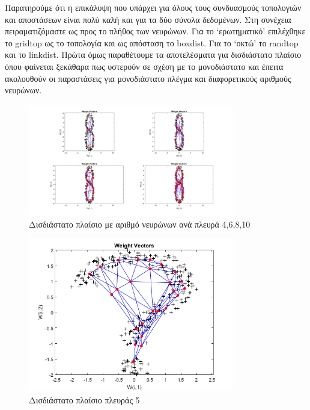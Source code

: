 \documentclass[12pt]{article}
\begin{document}
Παρατηρούμε ότι η επικάλυψη που υπάρχει για όλους τους συνδυασμούς τοπολογιών και αποστάσεων είναι πολύ καλή και για τα δύο σύνολα δεδομένων. Στη συνέχεια πειραματιζόμαστε ως προς το πλήθος των νευρώνων. Για το `ερωτηματικό' επιλέχθηκε το gridtop ως το τοπολογία και ως απόσταση το boxdist. Για το `οκτώ' το randtop και το linkdist. Πρώτα όμως παραθέτουμε τα αποτελέσματα για δισδιάστατο	πλαίσιο όπου φαίνεται ξεκάθαρα πως υστερούν σε σχέση με το μονοδιάστατο και έπειτα ακολουθούν οι παραστάσεις για μονοδιάστατο πλέγμα και διαφορετικούς αριθμούς νευρώνων.		
		\begin{figure}[H]
	 		\centering
			\includegraphics[width=0.8\textwidth]{fakelos/disdiastato_eight.png}
			\caption{Δισδιάστατο πλαίσιο με αριθμό νευρώνων ανά πλευρά 4,6,8,10} 	  
			\label{fig:2}
		\end{figure} 		
		\begin{figure}[H]
	 		\centering
			\includegraphics[width=0.8\textwidth]{fakelos/disdiastato_question.png}
			\caption{Δισδιάστατο πλαίσιο πλευράς 5} 	  
			\label{fig:2}
		\end{figure} 		
\end{document}
